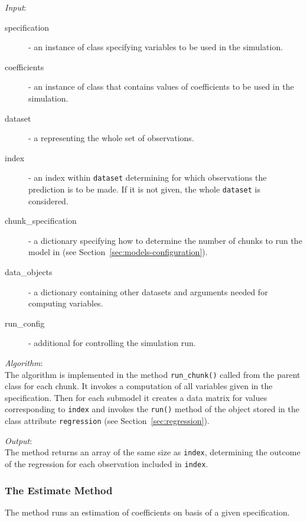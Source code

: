 {{\it Input}:
\begin{description}
\item[specification] - an instance of class 
  specifying variables \variablesindex to be used in the simulation.
\item[coefficients] \coefficientsindex - an instance of class  \coefficientsindex that contains
  values of coefficients \coefficientsindex to be used in the simulation.
\item[dataset] \datasetindex - a  \datasetindex representing the whole set of observations.
\item[index] - an index within \verb|dataset| determining for which
  observations the prediction is to be made. If it is not given, the whole
  \verb|dataset| \datasetindex is considered.
\item[chunk_specification] - a dictionary specifying how to determine the number
  of chunks to run the model in (see Section~\ref{sec:models-configuration}).
\item[data_objects] - a dictionary containing other datasets \datasetindex and arguments
  needed for computing variables. \variablesindex
\item[run_config] - additional  for controlling the simulation
  run.
\end{description}

{\it Algorithm}:~\\[1mm]
The algorithm is implemented in the method \verb|run_chunk()| called from the
parent class  for each chunk. It invokes a computation of
all variables \variablesindex given in the specification. Then for each submodel it creates a
data matrix for values corresponding to \verb|index| and invokes the
\verb|run()| method of the object stored in the class attribute \attributesindex
\verb|regression| (see Section~\ref{sec:regression}).

{\it Output}:~\\[1mm]
The method returns an array of the same size as \verb|index|, determining the
outcome of the regression for each observation included in \verb|index|.

\subsubsection{The Estimate Method}
The  method runs an estimation of coefficients \coefficientsindex on basis of
a given specification.

}
